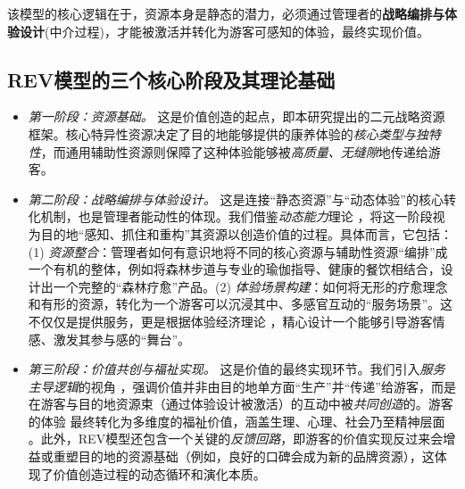 \documentclass[UTF8, 12pt, a4paper, twoside]{ctexart}
\begin{document}
该模型的核心逻辑在于，资源本身是静态的潜力，必须通过管理者的\textbf{战略编排与体验设计}(中介过程)，才能被激活并转化为游客可感知的体验，最终实现价值。

\subsection{REV模型的三个核心阶段及其理论基础}
\begin{itemize}
	\item \textit{第一阶段：资源基础。} 这是价值创造的起点，即本研究提出的二元战略资源框架。核心特异性资源决定了目的地能够提供的康养体验的\textit{核心类型与独特性}，而通用辅助性资源则保障了这种体验能够被\textit{高质量、无缝隙}地传递给游客。

	\item \textit{第二阶段：战略编排与体验设计。} 这是连接“静态资源”与“动态体验”的核心转化机制，也是管理者能动性的体现。我们借鉴\textit{动态能力}理论 \parencite{teece2007dynamic}，将这一阶段视为目的地“感知、抓住和重构”其资源以创造价值的过程。具体而言，它包括：(1) \textit{资源整合}：管理者如何有意识地将不同的核心资源与辅助性资源“编排”成一个有机的整体，例如将森林步道与专业的瑜伽指导、健康的餐饮相结合，设计出一个完整的“森林疗愈”产品。(2) \textit{体验场景构建}：如何将无形的疗愈理念和有形的资源，转化为一个游客可以沉浸其中、多感官互动的“服务场景”。这不仅仅是提供服务，更是根据体验经济理论 \parencite{pine1998well}，精心设计一个能够引导游客情感、激发其参与感的“舞台”。

	\item \textit{第三阶段：价值共创与福祉实现。} 这是价值的最终实现环节。我们引入\textit{服务主导逻辑}的视角 \parencite{vargo2004evolving}，强调价值并非由目的地单方面“生产”并“传递”给游客，而是在游客与目的地资源束（通过体验设计被激活）的互动中被\textit{共同创造}的。游客的体验 \parencite{luo2018towards, backman2022engaging} 最终转化为多维度的福祉价值，涵盖生理、心理、社会乃至精神层面 \parencite{zhangHealthTourismDestinations2021b, kandanparakkalPhysicalMentalSpiritual2024}。此外，REV模型还包含一个关键的\textit{反馈回路}，即游客的价值实现反过来会增益或重塑目的地的资源基础（例如，良好的口碑会成为新的品牌资源），这体现了价值创造过程的动态循环和演化本质。
\end{itemize}
\end{document}
